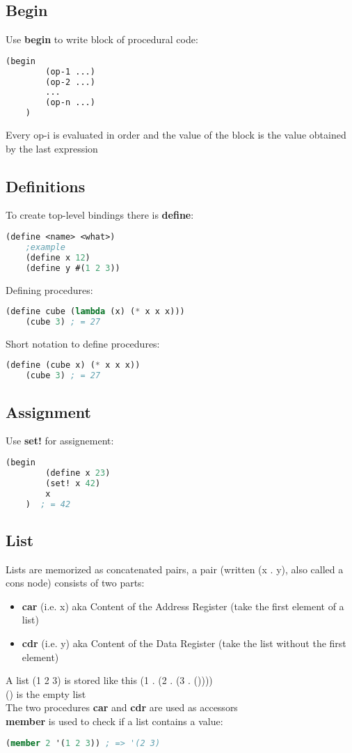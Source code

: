 \subsection{Begin}
Use \textbf{begin} to write block of procedural code:
\begin{lstlisting}[language=Lisp]
    (begin
        (op-1 ...)
        (op-2 ...)
        ...
        (op-n ...)
    )
\end{lstlisting}

Every op-i is evaluated in order and the value of the block is the value obtained by the last expression

\subsection{Definitions}
To create top-level bindings there is \textbf{define}:
\begin{lstlisting}[language=Lisp]
    (define <name> <what>)
    ;example
    (define x 12)
    (define y #(1 2 3))
\end{lstlisting}
Defining procedures:
\begin{lstlisting}[language=Lisp]
    (define cube (lambda (x) (* x x x)))
    (cube 3) ; = 27
\end{lstlisting}
Short notation to define procedures:
\begin{lstlisting}[language=Lisp]
    (define (cube x) (* x x x))
    (cube 3) ; = 27
\end{lstlisting}

\subsection{Assignment}
Use \textbf{set!} for assignement:
\begin{lstlisting}[language=Lisp]
    (begin
        (define x 23)
        (set! x 42)
        x
    )  ; = 42
\end{lstlisting}

\subsection{List}
Lists are memorized as concatenated pairs, a pair (written (x . y), also called a cons node) consists of two parts:
\begin{itemize}
    \item \textbf{car} (i.e. x) aka Content of the Address Register (take the first element of a list)
    \item \textbf{cdr} (i.e. y) aka Content of the Data Register (take the list without the first element)
\end{itemize}
A list (1 2 3) is stored like this (1 . (2 . (3 . ()))) \\
() is the empty list \\
The two procedures \textbf{car} and \textbf{cdr} are used as accessors \\
\textbf{member} is used to check if a list contains a value:
\begin{lstlisting}[language=Lisp]
    (member 2 '(1 2 3)) ; => '(2 3)
\end{lstlisting}

